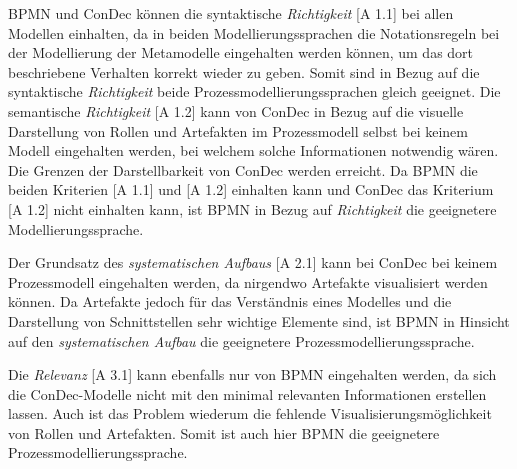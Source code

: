 {BPMN und ConDec können die syntaktische \textit{Richtigkeit} [A 1.1] bei allen Modellen einhalten, da in beiden Modellierungssprachen die Notationsregeln bei der Modellierung der Metamodelle eingehalten werden können, um das dort beschriebene Verhalten korrekt wieder zu geben. Somit sind in Bezug auf die syntaktische \textit{Richtigkeit} beide Prozessmodellierungssprachen gleich geeignet.\newline
Die semantische \textit{Richtigkeit} [A 1.2] kann von ConDec in Bezug auf die visuelle Darstellung von Rollen und Artefakten im Prozessmodell selbst bei keinem Modell eingehalten werden, bei welchem solche Informationen notwendig wären. Die Grenzen der Darstellbarkeit von ConDec  werden erreicht. \newline
Da BPMN die beiden Kriterien [A 1.1] und [A 1.2] einhalten kann und ConDec das Kriterium [A 1.2] nicht einhalten kann, ist BPMN in Bezug auf \textit{Richtigkeit} die geeignetere Modellierungssprache. \newline


Der  Grundsatz des \textit{systematischen Aufbaus} [A 2.1] kann bei ConDec bei keinem Prozessmodell eingehalten werden, da nirgendwo Artefakte visualisiert werden können. Da Artefakte jedoch für das Verständnis eines Modelles und die Darstellung von Schnittstellen sehr wichtige Elemente sind, ist BPMN in Hinsicht auf den \textit{systematischen Aufbau} die geeignetere Prozessmodellierungssprache. \newline


Die \textit{Relevanz} [A 3.1] kann ebenfalls nur von BPMN eingehalten werden, da sich die ConDec-Modelle nicht mit den minimal relevanten Informationen erstellen lassen. Auch ist das Problem wiederum die fehlende Visualisierungsmöglichkeit von Rollen und Artefakten. Somit ist auch hier BPMN die geeignetere Prozessmodellierungssprache.\newline

}
